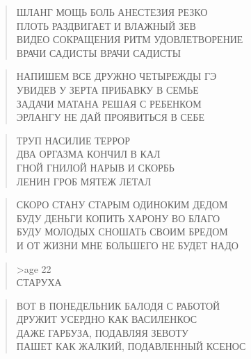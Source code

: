 \poemtitle{***}
\begin{verse}
ШЛАНГ МОЩЬ БОЛЬ АНЕСТЕЗИЯ РЕЗКО\\
ПЛОТЬ РАЗДВИГАЕТ И ВЛАЖНЫЙ ЗЕВ \\
ВИДЕО СОКРАЩЕНИЯ РИТМ УДОВЛЕТВОРЕНИЕ\\
ВРАЧИ САДИСТЫ ВРАЧИ САДИСТЫ
\end{verse}

\poemtitle{***}
\begin{verse}
НАПИШЕМ ВСЕ ДРУЖНО ЧЕТЫРЕЖДЫ ГЭ\\
УВИДЕВ У ЗЕРТА ПРИБАВКУ В СЕМЬЕ\\
ЗАДАЧИ МАТАНА РЕШАЯ С РЕБЕНКОМ\\
ЭРЛАНГУ НЕ ДАЙ ПРОЯВИТЬСЯ В СЕБЕ
\end{verse}

\poemtitle{***}
\begin{verse}
ТРУП НАСИЛИЕ ТЕРРОР \\
ДВА ОРГАЗМА КОНЧИЛ В КАЛ\\
ГНОЙ ГНИЛОЙ НАРЫВ И СКОРБЬ\\
ЛЕНИН ГРОБ МЯТЕЖ ЛЕТАЛ
\end{verse}

\poemtitle{***}
\begin{verse}
СКОРО СТАНУ СТАРЫМ ОДИНОКИМ ДЕДОМ\\
БУДУ ДЕНЬГИ КОПИТЬ ХАРОНУ ВО БЛАГО\\
БУДУ МОЛОДЫХ СНОШАТЬ СВОИМ БРЕДОМ\\
И ОТ ЖИЗНИ МНЕ БОЛЬШЕГО НЕ БУДЕТ НАДО
\end{verse}

\poemtitle{***}
\begin{verse}
>age 22\\
СТАРУХА
\end{verse}

\poemtitle{***}
\begin{verse}
ВОТ В ПОНЕДЕЛЬНИК БАЛОДЯ С РАБОТОЙ\\
ДРУЖИТ УСЕРДНО КАК ВАСИЛЕНКОС\\
ДАЖЕ ГАРБУЗА, ПОДАВЛЯЯ ЗЕВОТУ\\
ПАШЕТ КАК ЖАЛКИЙ, ПОДАВЛЕННЫЙ КСЕНОС
\end{verse}

